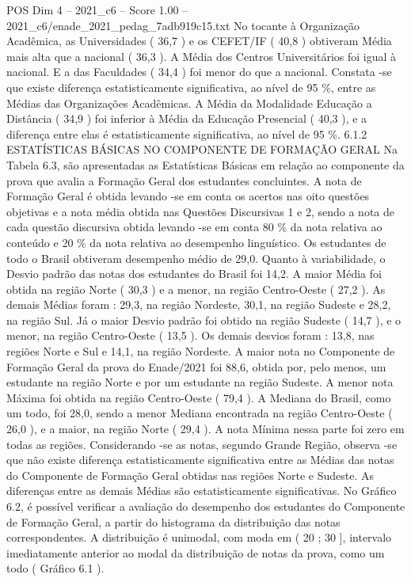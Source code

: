 \begin{textsample}{POS Dim 4 – 2021\_c6 – Score 1.00 – 2021\_c6/enade\_2021\_pedag\_7adb919c15.txt}
No tocante à Organização Acadêmica, as Universidades ( 36,7 ) e os CEFET/IF ( 40,8 ) obtiveram Média mais alta que a nacional ( 36,3 ).
A Média dos Centros Universitários foi igual à nacional.
E a das Faculdades ( 34,4 ) foi menor do que a nacional.
Constata -se que existe diferença estatisticamente significativa, ao nível de 95 \%, entre as Médias das Organizações Acadêmicas.
A Média da Modalidade Educação a Distância ( 34,9 ) foi inferior à Média da Educação Presencial ( 40,3 ), e a diferença entre elas é estatisticamente significativa, ao nível de 95 \%. 6.1.2 ESTATÍSTICAS BÁSICAS NO COMPONENTE DE FORMAÇÃO GERAL Na Tabela 6.3, são apresentadas as Estatísticas Básicas em relação ao componente da prova que avalia a Formação Geral dos estudantes concluintes.
A nota de Formação Geral é obtida levando -se em conta os acertos nas oito questões objetivas e a nota média obtida nas Questões Discursivas 1 e 2, sendo a nota de cada questão discursiva obtida levando -se em conta 80 \% da nota relativa ao conteúdo e 20 \% da nota relativa ao desempenho linguístico.
Os estudantes de todo o Brasil obtiveram desempenho médio de 29,0.
Quanto à variabilidade, o Desvio padrão das notas dos estudantes do Brasil foi 14,2.
A maior Média foi obtida na região Norte ( 30,3 ) e a menor, na região Centro-Oeste ( 27,2 ).
As demais Médias foram : 29,3, na região Nordeste, 30,1, na região Sudeste e 28,2, na região Sul.
Já o maior Desvio padrão foi obtido na região Sudeste ( 14,7 ), e o menor, na região Centro-Oeste ( 13,5 ).
Os demais desvios foram : 13,8, nas regiões Norte e Sul e 14,1, na região Nordeste.
A maior nota no Componente de Formação Geral da prova do Enade/2021 foi 88,6, obtida por, pelo menos, um estudante na região Norte e por um estudante na região Sudeste.
A menor nota Máxima foi obtida na região Centro-Oeste ( 79,4 ).
A Mediana do Brasil, como um todo, foi 28,0, sendo a menor Mediana encontrada na região Centro-Oeste ( 26,0 ), e a maior, na região Norte ( 29,4 ).
A nota Mínima nessa parte foi zero em todas as regiões.
Considerando -se as notas, segundo Grande Região, observa -se que não existe diferença estatisticamente significativa entre as Médias das notas do Componente de Formação Geral obtidas nas regiões Norte e Sudeste.
As diferenças entre as demais Médias são estatisticamente significativas.
No Gráfico 6.2, é possível verificar a avaliação do desempenho dos estudantes do Componente de Formação Geral, a partir do histograma da distribuição das notas correspondentes.
A distribuição é unimodal, com moda em ( 20 ; 30 ], intervalo imediatamente anterior ao modal da distribuição de notas da prova, como um todo ( Gráfico 6.1 ).

\end{textsample}
